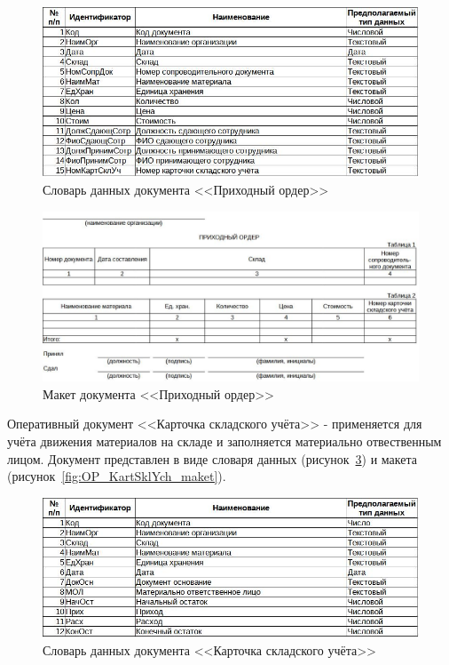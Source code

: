 \documentclass[12pt, a4paper, simple]{eskdtext}
\begin{document}
    \begin{figure}[!h]
        \centering
        \includegraphics[width=14cm]
            {_docs/ОП_ПрихОрд_типы.jpg}
        \caption{Словарь данных документа <<Приходный ордер>>}
        \label{fig:OP_PrihOrd_tipi}
    \end{figure}

    \begin{figure}[!h]
        \centering
        \includegraphics[width=14cm]
            {_docs/ОП_ПрихОрд_макет.jpg}
        \caption{Макет документа <<Приходный ордер>>}
        \label{fig:OP_PrihOrd_maket}
    \end{figure}


    \newpage
    Оперативный документ <<Карточка складского учёта>> - применяется для учёта движения материалов на складе
    и заполняется материально отвественным лицом.
    Документ представлен в виде словаря данных (рисунок~\ref{fig:OP_KartSklYch_tipi})
    и макета (рисунок~\ref{fig:OP_KartSklYch_maket}).

    \begin{figure}[!h]
        \centering
        \includegraphics[width=14cm]
            {_docs/ОП_КартСклУч_типы.jpg}
        \caption{Словарь данных документа <<Карточка складского учёта>>}
        \label{fig:OP_KartSklYch_tipi}
    \end{figure}
\end{document}
